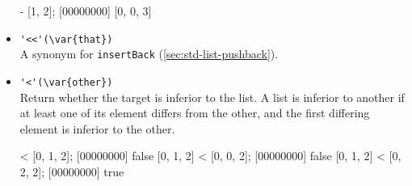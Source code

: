\begin{itemize}
\begin{urbiscript}[firstnumber=last]
[0, 1, 0, 2, 3] - [1, 2];
[00000000] [0, 0, 3]
\end{urbiscript}

\item \lstinline|'<<'(\var{that})|\\
A synonym for \lstinline|insertBack| (\autoref{sec:std-list-pushback}).

\item \lstinline|'<'(\var{other})|\\
Return whether the target is inferior to the  list. A list is
inferior to another if at least one of its element differs from the
other, and the first differing element is inferior to the other.

\begin{urbiscript}[firstnumber=last]
[0, 1, 2] < [0, 1, 2];
[00000000] false
[0, 1, 2] < [0, 0, 2];
[00000000] false
[0, 1, 2] < [0, 2, 2];
[00000000] true
\end{urbiscript}

\end{itemize}


